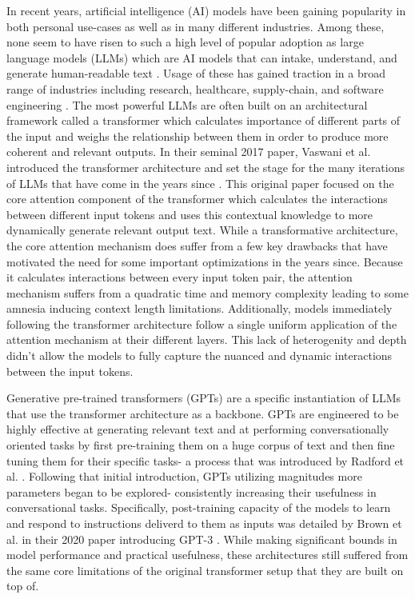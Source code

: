 In recent years, artificial intelligence (AI) models have been gaining popularity in both personal use-cases 
as well as in many different industries. Among these, none seem to have risen to such a high level of 
popular adoption as large language models (LLMs) which are AI models that can intake, understand, and generate
human-readable text \cite{brown2020languagemodelsfewshotlearners}. Usage of these has gained traction in a broad 
range of industries including 
research, healthcare, supply-chain, and software engineering 
\cite {liang2024mappingincreasingusellms} \cite{ZHANG2025102883} \cite{urlana2024llmsindustriallensdeciphering}. 
The most powerful LLMs are often built on 
an architectural framework called a transformer which calculates importance of different parts of the input and weighs 
the relationship between them in order to produce more coherent and relevant outputs.
In their seminal 2017 paper, Vaswani et al. introduced the 
transformer architecture and set the stage for the many iterations of LLMs that 
have come in the years since \cite{vaswani2023attentionneed}. This original paper focused on the core attention 
component of the transformer which calculates the interactions between different
input tokens and uses this contextual knowledge to more dynamically generate 
relevant output text. While a transformative architecture, the core attention mechanism does suffer from 
a few key drawbacks that have motivated the need for some important optimizations in the years since. 
Because it calculates interactions between every input token pair, the attention mechanism suffers from 
a quadratic time and memory complexity leading to some amnesia inducing context length limitations. Additionally, 
models immediately following the transformer architecture follow a single uniform application of the attention 
mechanism at their different layers. This lack of heterogenity and depth didn't allow the models to 
fully capture the nuanced and dynamic interactions between the input tokens.

Generative pre-trained transformers (GPTs) are a specific instantiation of LLMs that use the transformer architecture as a backbone. 
GPTs are engineered to be highly effective at generating relevant text and at performing 
conversationally oriented tasks by first pre-training them on a huge corpus of text and then fine tuning
them for their specific tasks- a process that was introduced by Radford et al. \cite{radford2018improving}. Following 
that initial introduction, GPTs utilizing magnitudes more parameters began to be explored- consistently
increasing their usefulness in conversational tasks. Specifically, post-training capacity of the 
models to learn and respond to instructions deliverd to them as inputs was detailed by Brown et al. in their 
2020 paper introducing GPT-3 \cite{brown2020languagemodelsfewshotlearners}. 
While making significant bounds in model performance and practical usefulness, these architectures still 
suffered from the same core limitations of the original transformer setup that they are built on top of. 

